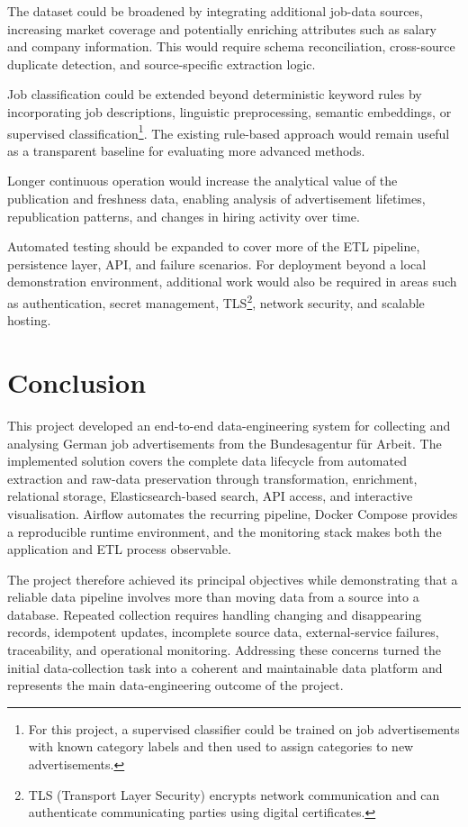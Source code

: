 \documentclass[11pt,a4paper]{article}
\begin{document}
The dataset could be broadened by integrating additional job-data sources, increasing market coverage and potentially enriching attributes such as salary and company information. This would require schema reconciliation, cross-source duplicate detection, and source-specific extraction logic.

Job classification could be extended beyond deterministic keyword rules by incorporating job descriptions, linguistic preprocessing, semantic embeddings, or supervised classification\footnote{For this project, a supervised classifier could be trained on job advertisements with known category labels and then used to assign categories to new advertisements.}. The existing rule-based approach would remain useful as a transparent baseline for evaluating more advanced methods.

Longer continuous operation would increase the analytical value of the publication and freshness data, enabling analysis of advertisement lifetimes, republication patterns, and changes in hiring activity over time.

Automated testing should be expanded to cover more of the ETL pipeline, persistence layer, API, and failure scenarios. For deployment beyond a local demonstration environment, additional work would also be required in areas such as authentication, secret management, TLS\footnote{TLS (Transport Layer Security) encrypts network communication and can authenticate communicating parties using digital certificates.}, network security, and scalable hosting.




\section{Conclusion}

This project developed an end-to-end data-engineering system for collecting and analysing German job advertisements from the Bundesagentur für Arbeit. The implemented solution covers the complete data lifecycle from automated extraction and raw-data preservation through transformation, enrichment, relational storage, Elasticsearch-based search, API access, and interactive visualisation. Airflow automates the recurring pipeline, Docker Compose provides a reproducible runtime environment, and the monitoring stack makes both the application and ETL process observable.

The project therefore achieved its principal objectives while demonstrating that a reliable data pipeline involves more than moving data from a source into a database. Repeated collection requires handling changing and disappearing records, idempotent updates, incomplete source data, external-service failures, traceability, and operational monitoring. Addressing these concerns turned the initial data-collection task into a coherent and maintainable data platform and represents the main data-engineering outcome of the project.

\printbibliography[heading=bibintoc, title={References}]
	
\end{document}
